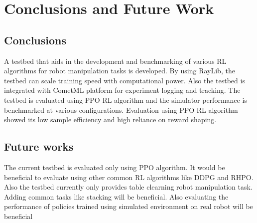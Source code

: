 \chapter{Conclusions and Future Work}

\section{Conclusions}
A testbed that aids in the development and benchmarking of various RL algorithms for robot manipulation tasks is developed. By using RayLib, the testbed can scale training speed with computational power. Also the testbed is integrated with CometML platform for experiment logging and tracking. The testbed is evaluated using PPO RL algorithm and the simulator performance is benchmarked at various configurations. Evaluation using PPO RL algorithm showed its low sample efficiency and high reliance on reward shaping.

\section{Future works}
The current testbed is evaluated only using PPO algorithm. It would be beneficial to evaluate using other common RL algorithms like DDPG and RHPO. Also the testbed currently only provides table clearning robot manipulation task. Adding common tasks like stacking will be beneficial. Also evaluating the performance of policies trained using simulated environment on real robot will be beneficial